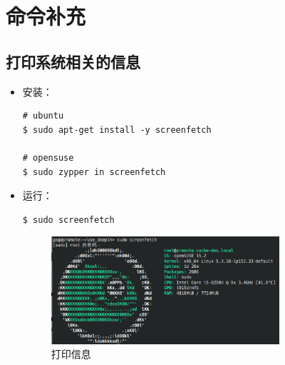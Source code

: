 
\chapter{命令补充}


\section{打印系统相关的信息}
\begin{itemize}
\item 安装：
\begin{lstlisting}
# ubuntu 
$ sudo apt-get install -y screenfetch 

# opensuse 
$ sudo zypper in screenfetch
\end{lstlisting}

\item 运行：
\begin{lstlisting}
$ sudo screenfetch
\end{lstlisting}

\begin{figure}[htp]  
    \centering
    \includegraphics[width=0.8\textwidth]{./img/screenfetch.png} %
    \caption{打印信息} %
    \label{screenfetch} %
\end{figure}
\end{itemize}